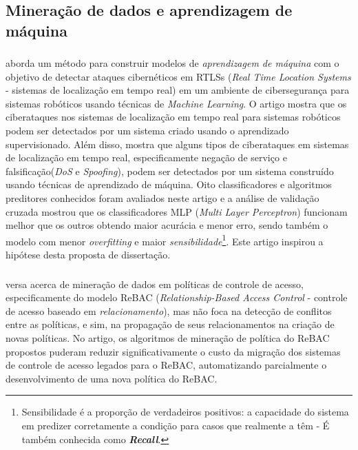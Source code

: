 \subsection{Mineração de dados e aprendizagem de máquina}\label{trab-rel:MD e AM}
\subsubsection{}
 aborda um método para construir modelos de \textit{aprendizagem de máquina} com o objetivo de detectar ataques cibernéticos em RTLSs (\textit{Real Time Location Systems} - sistemas de localização em tempo real) em um ambiente de cibersegurança para sistemas robóticos usando técnicas de \textit{Machine Learning}.  O artigo mostra que os ciberataques nos sistemas de localização em tempo real para sistemas robóticos podem ser detectados por um sistema criado usando o aprendizado supervisionado. Além disso, mostra que alguns tipos de ciberataques em sistemas de localização em tempo real, especificamente negação de serviço e falsificação(\textit{DoS} e \textit{Spoofing}), podem ser detectados por um sistema construído usando técnicas de aprendizado de máquina. Oito classificadores e algoritmos preditores conhecidos foram avaliados neste artigo e a análise de validação cruzada mostrou que os classificadores MLP (\textit{Multi Layer Perceptron}) funcionam melhor que os outros obtendo maior acurácia e menor erro, sendo também o modelo com menor \textit{overfitting} e maior \textit{sensibilidade}\footnote{Sensibilidade é a proporção de verdadeiros positivos: a capacidade do sistema em predizer corretamente a condição para casos que realmente a têm - É também conhecida como \textit{\textbf{Recall}}.}. Este artigo inspirou a hipótese desta proposta de dissertação.

\subsubsection{}
 versa acerca de mineração de dados em políticas de controle de acesso, especificamente do modelo ReBAC (\textit{Relationship-Based Access Control} - controle de acesso baseado em \textit{relacionamento}), mas não foca na detecção de conflitos entre as políticas, e sim, na propagação de seus relacionamentos na criação de novas políticas. No artigo, os algoritmos de mineração de política do ReBAC propostos puderam reduzir significativamente o custo da migração dos sistemas de controle de acesso legados para o ReBAC, automatizando parcialmente o desenvolvimento de uma nova política do ReBAC.

